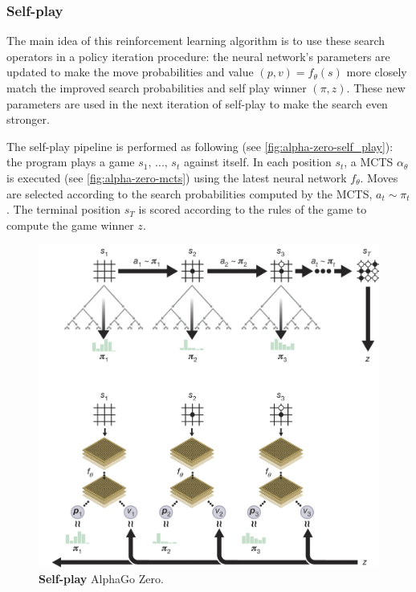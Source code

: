 \documentclass{article}
\begin{document}
\subsubsection{Self-play}

The main idea of this reinforcement learning algorithm is to use these search operators in a policy iteration procedure: the neural network's parameters are updated to make the move probabilities and value $(p, v) = f_\theta(s)$ more closely match the improved search probabilities and self play winner $(\pi, z)$. These new parameters are used in the next iteration of self-play to make the search even stronger.

The self-play pipeline is performed as following (see \autoref{fig:alpha-zero-self_play}): the program plays a game $s_1, \, ..., \, s_t$ against itself. In each position $s_t$, a MCTS $\alpha_\theta$ is executed (see \autoref{fig:alpha-zero-mcts}) using the latest neural network $f_\theta$. Moves are selected according to the search probabilities computed by the MCTS, $a_t \sim \pi_t$. The terminal position $s_T$ is scored according to the rules of the game to compute the game winner $z$.

\begin{figure}[H]
		\centering
		\includegraphics[width=12cm,trim={66px 430px 0px 0px},clip]{alpha_go_zero_training.png}
		
		\caption{
			\textbf{Self-play} AlphaGo Zero.\cite{Silver_2016}}
		\label{fig:alpha-zero-self_play}
\end{figure}
\end{document}
